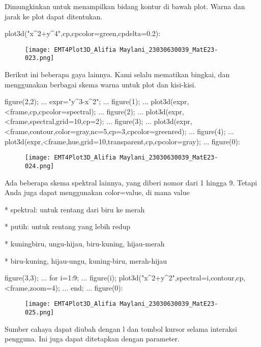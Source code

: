 \documentclass{article}
\begin{document}
Dimungkinkan untuk menampilkan bidang kontur di bawah plot. Warna dan
jarak ke plot dapat ditentukan.


\>plot3d("x^2+y^4",\>cp,cpcolor=green,cpdelta=0.2):


\begin{figure}
    \centering
    \texttt{[image: EMT4Plot3D\_Alifia Maylani\_23030630039\_MatE23-023.png]}
    \caption{}
    \label{fig:enter-label}
\end{figure}

Berikut ini beberapa gaya lainnya. Kami selalu mematikan bingkai, dan
menggunakan berbagai skema warna untuk plot dan kisi-kisi.


\>figure(2,2); ...  
\>   expr="y^3-x^2"; ...  
\>   figure(1);  ...  
\>     plot3d(expr,<frame,\>cp,cpcolor=spectral); ...  
\>   figure(2);  ...  
\>     plot3d(expr,<frame,\>spectral,grid=10,cp=2); ...  
\>   figure(3);  ...  
\>     plot3d(expr,<frame,\>contour,color=gray,nc=5,cp=3,cpcolor=greenred); ...  
\>   figure(4);  ...  
\>     plot3d(expr,<frame,\>hue,grid=10,\>transparent,\>cp,cpcolor=gray); ...  
\>   figure(0):


\begin{figure}
    \centering
    \texttt{[image: EMT4Plot3D\_Alifia Maylani\_23030630039\_MatE23-024.png]}
    \caption{}
    \label{fig:enter-label}
\end{figure}

Ada beberapa skema spektral lainnya, yang diberi nomor dari 1 hingga
9. Tetapi Anda juga dapat menggunakan color=value, di mana value


* 
spektral: untuk rentang dari biru ke merah

* 
putih: untuk rentang yang lebih redup

* 
kuningbiru, ungu-hijau, biru-kuning, hijau-merah

* 
biru-kuning, hijau-ungu, kuning-biru, merah-hijau


\>figure(3,3); ...  
\>   for i=1:9;  ...  
\>     figure(i); plot3d("x^2+y^2",spectral=i,\>contour,\>cp,<frame,zoom=4);  ...  
\>   end; ...  
\>   figure(0):


\begin{figure}
    \centering
    \texttt{[image: EMT4Plot3D\_Alifia Maylani\_23030630039\_MatE23-025.png]}
    \caption{}
    \label{fig:enter-label}
\end{figure}

Sumber cahaya dapat diubah dengan l dan tombol kursor selama interaksi
pengguna. Ini juga dapat ditetapkan dengan parameter.
\end{document}
